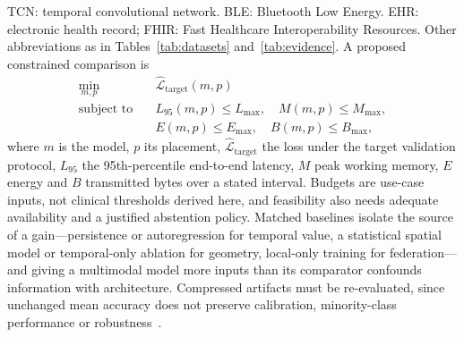 \documentclass[journal]{IEEEtran}
\begin{document}
\noindent TCN: temporal convolutional network. BLE: Bluetooth Low Energy. EHR: electronic health record; FHIR: Fast Healthcare Interoperability Resources. Other abbreviations as in Tables~\ref{tab:datasets} and~\ref{tab:evidence}.
 A proposed constrained comparison is
\begin{equation}
\begin{aligned}
\min_{m,p}\quad &\widehat{\mathcal{L}}_{\mathrm{target}}(m,p)\\
\text{subject to}\quad &L_{95}(m,p)\leq L_{\max},\quad M(m,p)\leq M_{\max},\\
&E(m,p)\leq E_{\max},\quad B(m,p)\leq B_{\max},
\end{aligned}
\label{eq:selectionbudget}
\end{equation}
where $m$ is the model, $p$ its placement, $\widehat{\mathcal L}_{\mathrm{target}}$ the loss under the target validation protocol, $L_{95}$ the 95th-percentile end-to-end latency, $M$ peak working memory, $E$ energy and $B$ transmitted bytes over a stated interval. Budgets are use-case inputs, not clinical thresholds derived here, and feasibility also needs adequate availability and a justified abstention policy. Matched baselines isolate the source of a gain---persistence or autoregression for temporal value, a statistical spatial model or temporal-only ablation for geometry, local-only training for federation---and giving a multimodal model more inputs than its comparator confounds information with architecture. Compressed artifacts must be re-evaluated, since unchanged mean accuracy does not preserve calibration, minority-class performance or robustness~\cite{5,verbiest2023gaitstride}.
\end{document}
